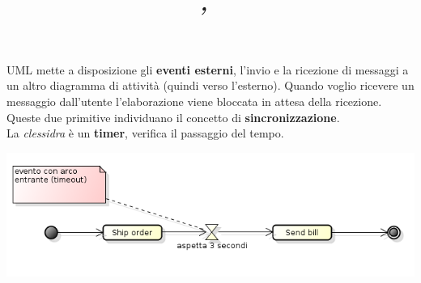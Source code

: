 


\pagestyle{fancy}
\rhead{\firstxmark} %
\lfoot{\lastxmark} %
\cfoot{} %
\renewcommand\headrulewidth{0.4pt} %
\renewcommand\footrulewidth{0.4pt} %


\title{
\vspace{2in}
\textmd{\textbf{}\\
\normalsize\vspace{0.1in}\small{}\\
\vspace{0.1in}\large{\textit{,\ }}
\vspace{3in}
}
}

\author{\textbf{}}
\date{} %




\maketitle
\newpage
\newpage

UML mette a disposizione gli \textbf{eventi esterni}, l'invio e la ricezione di messaggi a un altro diagramma di attività (quindi verso l'esterno). Quando voglio ricevere un messaggio dall'utente l'elaborazione viene bloccata in attesa della ricezione. Queste due primitive individuano il concetto di \textbf{sincronizzazione}.\\
La \textit{clessidra} è un \textbf{timer}, verifica il passaggio del tempo.

\begin{center}

\includegraphics[width=0.75\columnwidth]{img1} %

\end{center}

